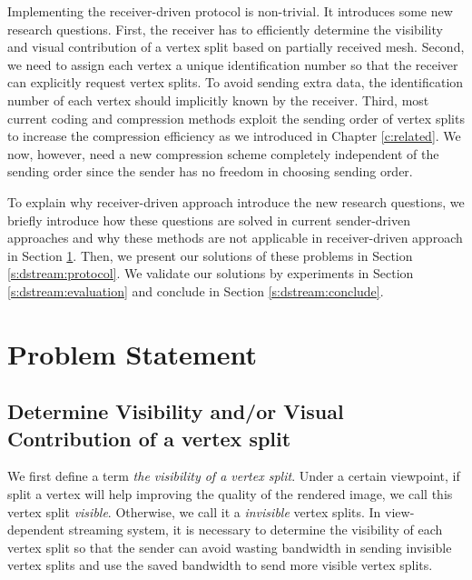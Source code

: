     Implementing the receiver-driven protocol is non-trivial. It introduces some 
    new research questions.
    First, the receiver has to efficiently determine the visibility and visual contribution
    of a vertex split based on partially received mesh. 
    Second, we need to assign each vertex a unique identification number
    so that the receiver can explicitly request vertex splits. 
    To avoid sending extra data, the identification number of each vertex 
    should implicitly known by the receiver.
    Third, most current coding and compression methods exploit the sending order of vertex splits
    to increase the compression efficiency as we introduced in Chapter \ref{c:related}.
    We now, however, need a new compression scheme
    completely independent of the sending order since the sender has no freedom in choosing sending order.

    To explain why receiver-driven approach introduce the new research questions,
    we briefly introduce how these questions are solved in current sender-driven approaches and 
    why these methods are not applicable in receiver-driven approach in Section \ref{s:dstream:terms}.
    Then, we present our solutions of these problems in Section \ref{s:dstream:protocol}.
    We validate our solutions by experiments in Section \ref{s:dstream:evaluation} 
    and conclude in Section \ref{s:dstream:conclude}.

\section{Problem Statement}
\label{s:dstream:terms}
    \subsection{Determine Visibility and/or Visual Contribution of a vertex split}
    We first define a term \emph{the visibility of a vertex split}. Under a certain
    viewpoint, if split a vertex will help improving the quality of the rendered image,
    we call this vertex split \emph{visible}. Otherwise, we call it a \emph{invisible}
    vertex splits.
    In view-dependent streaming system, it is necessary to determine the visibility
    of each vertex split so that the sender can avoid wasting bandwidth in sending invisible 
    vertex splits and use the saved bandwidth to send more visible vertex splits.

